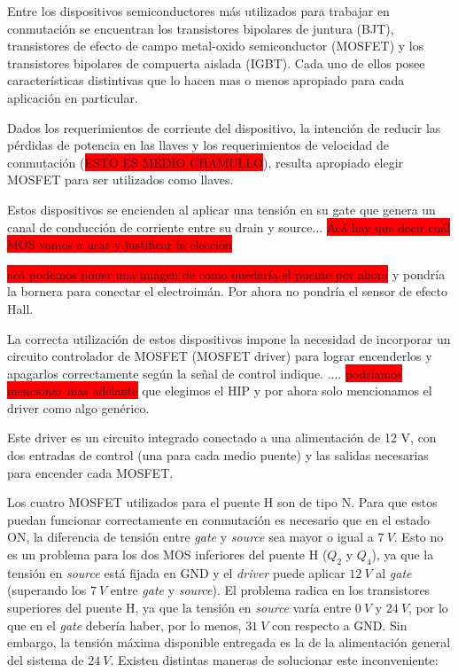 Entre los dispositivos semiconductores más utilizados para trabajar en conmutación se encuentran los transistores bipolares de juntura (BJT), transistores de efecto de campo metal-oxido semiconductor (MOSFET) y los transistores bipolares de compuerta aislada (IGBT). Cada uno de ellos posee características distintivas que lo hacen mas o menos apropiado para cada aplicación en particular.

Dados los requerimientos de corriente del dispositivo, la intención de reducir las pérdidas de potencia en las llaves y los requerimientos de velocidad de conmutación (\colorbox{red}{ESTO ES MEDIO CHAMULLO}), resulta apropiado elegir MOSFET para ser utilizados como llaves. 


Estos dispositivos se encienden al aplicar una tensión en su gate que genera un canal de conducción de corriente entre su drain y source...
\colorbox{red}{Acá hay que decir cuál MOS vamos a usar y justificar la elección}

\colorbox{red}{acá podemos poner una imagen de como quedaría el puente por ahora} y pondría la bornera para conectar el electroimán. Por ahora no pondría el sensor de efecto Hall.
 
La correcta utilización de estos dispositivos impone la necesidad de incorporar un circuito controlador de MOSFET (MOSFET driver) para lograr encenderlos y apagarlos correctamente según la señal de control indique. .... \colorbox{red}{podríamos mencionar mas adelante} que elegimos el HIP y por ahora solo mencionamos el driver como algo genérico.

Este driver es un circuito integrado conectado a una alimentación de 12 V, con dos entradas de control (una para cada medio puente) y las salidas necesarias para encender cada MOSFET.


\noindent Los cuatro MOSFET utilizados para el puente H son de tipo N. Para que estos puedan funcionar correctamente en conmutación es necesario que en el estado ON, la diferencia de tensión entre \textsl{gate} y \textsl{source} sea mayor o igual a $7\:V$. Esto no es un problema para los dos MOS inferiores del puente H ($Q_2$ y $Q_4$), ya que la tensión en \textsl{source} está fijada en GND y el \textsl{driver} puede aplicar $12\:V$ al \textsl{gate} (superando los $7\:V$ entre \textsl{gate} y \textsl{source}). El problema radica en los transistores superiores del puente H, ya que la tensión en \textsl{source} varía entre $0\:V$ y $24\:V$, por lo que en el \textsl{gate} debería haber, por lo menos, $31\:V$ con respecto a GND. Sin embargo, la tensión máxima disponible entregada es la de la alimentación general del sistema de $24\:V$. Existen distintas maneras de solucionar este inconveniente:


